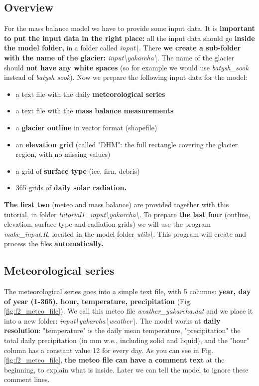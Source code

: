 \documentclass[15pt]{extarticle}
\begin{document}
\subsection{Overview}
For the mass balance model we have to provide some input data. It is \textbf{important to put the input data in the right place:} all the input data should go \textbf{inside the model folder,} in a folder called \textit{input\textbackslash}. There \textbf{we create a sub-folder with the name of the glacier:} \textit{input\textbackslash yakarcha\textbackslash}. The name of the glacier should \textbf{not have any white spaces} (so for example we would use \textit{batysh\_sook} instead of \textit{batysh sook}). Now we prepare the following input data for the model:
\begin{itemize}
    \item a text file with the daily \textbf{meteorological series}
    \item a text file with the \textbf{mass balance measurements}
    \item a \textbf{glacier outline} in vector format (shapefile)
    \item an \textbf{elevation grid} (called "DHM": the full rectangle covering the glacier region, with no missing values)
    \item a grid of \textbf{surface type} (ice, firn, debris)
    \item 365 grids of \textbf{daily solar radiation.}
\end{itemize}
\textbf{The first two} (meteo and mass balance) are provided together with this tutorial, in folder \textit{tutorial1\_input\textbackslash yakarcha\textbackslash}. To prepare \textbf{the last four} (outline, elevation, surface type and radiation grids) we will use the program \textit{make\_input.R}, located in the model folder \textit{utils\textbackslash}. This program will create and process the files \textbf{automatically.}

\subsection{Meteorological series}
\label{sect:input_meteo}
The meteorological series goes into a simple text file, with 5 columns: \textbf{year, day of year (1-365), hour, temperature, precipitation} (Fig. \ref{fig:f2_meteo_file}). We call this meteo file \textit{weather\_yakarcha.dat} and we place it into a new folder: \textit{input\textbackslash yakarcha\textbackslash weather\textbackslash}. The model works at \textbf{daily resolution}: "temperature" is the daily mean temperature, "precipitation" the total daily precipitation (in mm w.e., including solid and liquid), and the "hour" column has a constant value 12 for every day. As you can see in Fig. \ref{fig:f2_meteo_file}, \textbf{the meteo file can have a comment text} at the beginning, to explain what is inside. Later we can tell the model to ignore these comment lines.
\end{document}
